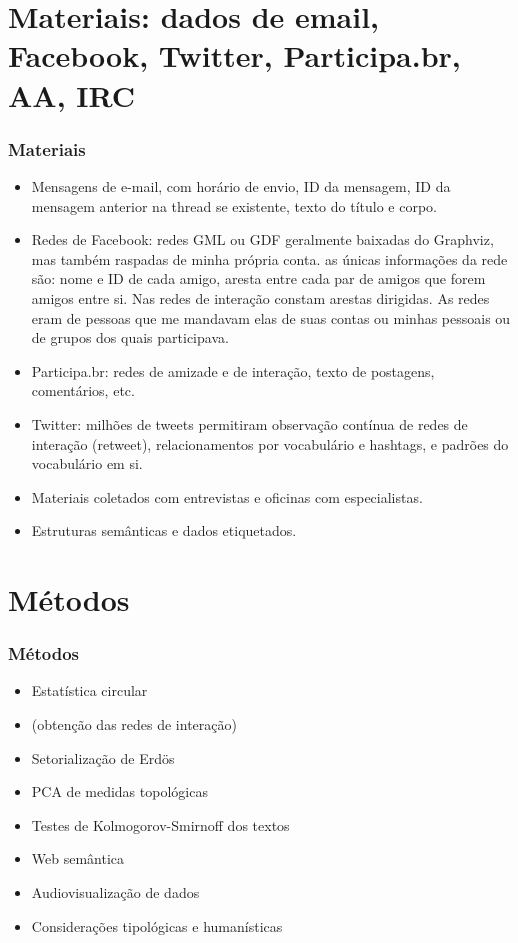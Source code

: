 \documentclass[10pt]{beamer}
\begin{document}
\section{Materiais: dados de email, Facebook, Twitter, Participa.br, AA, IRC}
\begin{frame}
\frametitle{Materiais}
\begin{itemize}
	\item Mensagens de e-mail, com horário de envio, ID da mensagem, ID da mensagem anterior na thread se existente, texto do título e corpo. 
	\item Redes de Facebook: redes GML ou GDF geralmente baixadas do Graphviz, mas também raspadas de minha própria conta. as únicas informações da rede são: nome e ID de cada amigo, aresta entre cada par de amigos que forem amigos entre si. Nas redes de interação constam arestas dirigidas. As redes eram de pessoas que me mandavam elas de suas contas ou minhas pessoais ou de grupos dos quais participava.
	\item Participa.br: redes de amizade e de interação, texto de postagens, comentários, etc.
	\item Twitter: milhões de tweets permitiram observação contínua de redes de interação (retweet), relacionamentos por vocabulário e hashtags, e padrões do vocabulário em si.
	\item Materiais coletados com entrevistas e oficinas com especialistas.
	\item Estruturas semânticas e dados etiquetados.
\end{itemize}
\end{frame}



\section{Métodos}
\begin{frame}
\frametitle{Métodos}
\begin{itemize}
	\item Estatística circular
	\item (obtenção das redes de interação)
	\item Setorialização de Erdös
	\item PCA de medidas topológicas
	\item Testes de Kolmogorov-Smirnoff dos textos
	\item Web semântica
	\item Audiovisualização de dados
	\item Considerações tipológicas e humanísticas
\end{itemize}
\end{frame}
\end{document}
